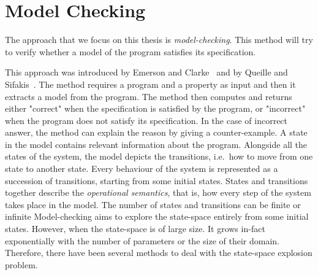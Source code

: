 \chapter{Model Checking}
\label{section:model:checking}
%
%
%
The approach that we focus on this thesis is
\emph{model-checking}.
%
%
This method will try to verify whether a model of the program
satisfies its specification.
%
%
 
This approach was introduced by Emerson and Clarke~\cite{CE82} and by Queille and Sifakis~\cite{QS82}. The method requires a program and a property as input and then it extracts a model from the program. The method then computes and returns either "correct" when the specification is satisfied by the program, or "incorrect" when the program does not satisfy its specification. In the case of incorrect answer, the method can explain the reason by giving a counter-example. A state in the model contains relevant information about the program. Alongside all the states of the system, the model depicts the
transitions, i.e.\ how to move from one state to another state. Every behaviour of the system is represented as a succession of transitions, starting from some initial states. States and transitions together describe the \emph{operational
  semantics}, that is, how every step of the system takes place in the model. The number of states and transitions can be finite or infinite Model-checking aims to explore the state-space entirely from some initial states. However, when the state-space is of large size. It grows in-fact
exponentially with the number of parameters or the size of their
domain. Therefore, there have been several methods to deal with the
state-space explosion problem.
                   

